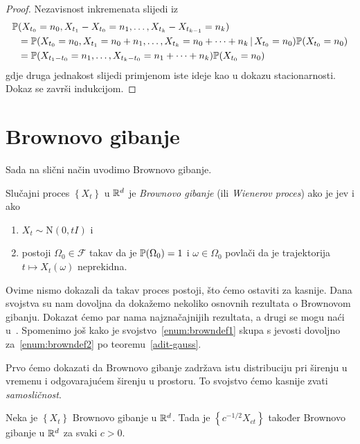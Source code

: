 \documentclass[main.tex]{subfiles}
\begin{document}
\begin{proof}
	Nezavisnost inkremenata slijedi iz
	\begin{equation}
		\begin{aligned}
			\P & (X_{t_0}=n_0, X_{t_1}- X_{t_0} = n_1, \ldots, X_{t_k}-X_{t_{k-1}} = n_k)                                \\
			   & =\P(X_{t_0} = n_0, X_{t_1}=n_0+n_1, \ldots, X_{t_k} = n_0+\cdots+n_k \given X_{t_0}=n_0)\P(X_{t_0}=n_0) \\
			   & =\P(X_{t_1-t_0}=n_1,\ldots,X_{t_k-t_0}=n_1+\cdots+n_k)\P(X_{t_0}=n_0)
		\end{aligned}
	\end{equation}
	gdje druga jednakost slijedi primjenom iste ideje kao u dokazu stacionarnosti. Dokaz se završi indukcijom.
\end{proof}

\section{Brownovo gibanje}\label{sec:sp-brown}
Sada na slični način uvodimo Brownovo gibanje.

\begin{definicija} \label{def:brown}
	Slučajni proces \( \left\{ X_t \right\} \) u \( \R^d \) je \emph{Brownovo gibanje} (ili \emph{Wienerov proces}) ako je \levy jev i ako
	\begin{enumerate}[label=(\roman*)]
		\item \( X_t \sim \mathrm N(0, tI) \) i \label{enum:browndef1}
		\item postoji \( \Omega_0 \in \mathcal F \) takav da je \( \P(\Omega_0)=1 \) i \( \omega \in \Omega_0 \) povlači da je trajektorija \( t \mapsto X_t(\omega) \) neprekidna. \label{enum:browndef2}
	\end{enumerate}
\end{definicija}

Ovime nismo dokazali da takav proces postoji, što ćemo ostaviti za kasnije. Dana svojstva su nam dovoljna da dokažemo nekoliko osnovnih rezultata
o Brownovom gibanju. Dokazat ćemo par nama najznačajnijih rezultata, a drugi se mogu naći u~\cite[]{sato}. Spomenimo još kako je svojstvo~\ref{enum:browndef1}
skupa s \levy jevosti dovoljno za~\ref{enum:browndef2} po teoremu~\ref{adit-gauss}.

Prvo ćemo dokazati da Brownovo gibanje zadržava istu distribuciju pri širenju u vremenu i odgovarajućem širenju u prostoru. To svojstvo ćemo kasnije zvati
\emph{samosličnost}.

\begin{teorem} \label{tm:brown-samoslicnost}
	Neka je \( \left\{ X_t \right\} \) Brownovo gibanje u \( \R^d \). Tada je \( \left\{ c^{-1/2}X_{ct} \right\} \) također Brownovo gibanje
	u \( \R^d \) za svaki \( c > 0 \).
\end{teorem}
\end{document}
